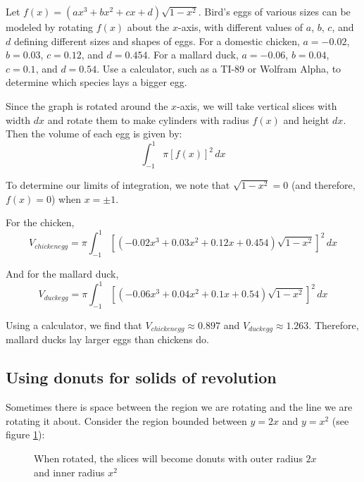 \begin{Exercise}[label = volume5]
Let $f(x) = (ax^3 + bx^2 + cx + d)\sqrt{1-x^2}$. Bird's eggs of various sizes 
can be modeled by rotating $f(x)$ about the $x$-axis, with different values of 
$a$, $b$, $c$, and $d$ defining different sizes and shapes of eggs. For a 
domestic chicken, $a = -0.02$, $b = 0.03$, $c = 0.12$, and $d = 0.454$. For a 
mallard duck, $a = -0.06$, $b = 0.04$, $c = 0.1$, and $d = 0.54$. Use a 
calculator, such as a TI-89 or Wolfram Alpha, to determine which species lays 
a bigger egg.  
\vspace{50mm}
\end{Exercise}

\begin{Answer}[ref = volume5]
Since the graph is rotated around the $x$-axis, we will take vertical slices 
with width $dx$ and rotate them to make cylinders with radius $f(x)$ and height
$dx$. Then the volume of each egg is given by:
$$\int_{-1}^1 \pi \left[ f(x) \right]^2\,dx$$

To determine our limits of integration, we note that $\sqrt{1 - x^2} = 0$ (and 
therefore, $f(x) = 0$) when $x = \pm 1$.

For the chicken, 
$$V_{chicken egg} = \pi \int_{-1}^1 \left[ \left(-0.02x^3 + 0.03x^2 + 0.12x + 
0.454 \right) \sqrt{1 - x^2} \right]^2\,dx$$

And for the mallard duck,
$$V_{duck egg} = \pi \int_{-1}^1 \left[ \left( -0.06x^3 + 0.04x^2 + 0.1x + 
0.54 \right) \sqrt{1 - x^2} \right]^2\,dx$$

Using a calculator, we find that $V_{chicken egg} \approx 0.897$ and 
$V_{duck egg} \approx 1.263$. Therefore, mallard ducks lay larger eggs than 
chickens do. 
\end{Answer}

\subsection{Using donuts for solids of revolution}
Sometimes there is space between the region we are rotating and the line we are
rotating it about. Consider the region bounded between $y = 2x$ and $y = x^2$  
(see figure \ref{fig:donut}):

\begin{figure}[htbp]
    \centering
    \caption{When rotated, the slices will become donuts with outer radius $2x$
    and inner radius $x^2$}
    \label{fig:donut}
\end{figure}

